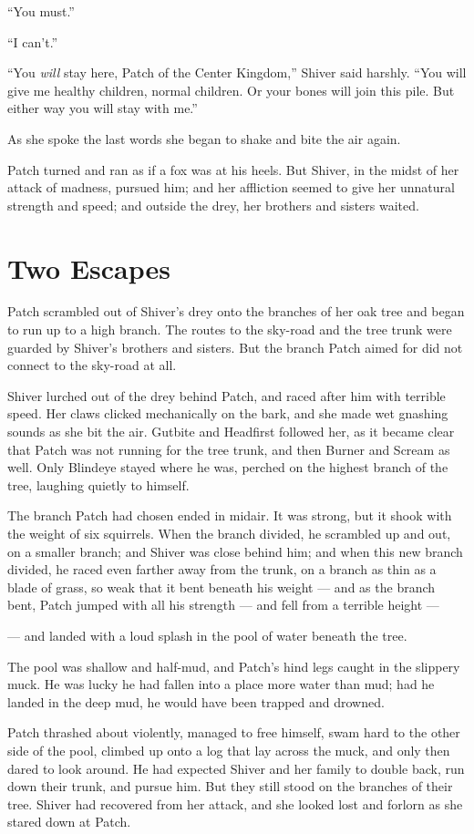\documentclass[ebook,oneside,openany,17pt]{memoir}
\renewcommand{\thechapter}{\Roman{chapter}}
\newcounter{sections}
\newcommand{\sections}[1]{%
  \section*{#1}
  \addtocounter{sections}{1}%
  \pdfbookmark[1]{#1}{section.\thechapter.\thesections}}
\begin{document}
“You must.”

“I can’t.”

“You \emph{will} stay here, Patch of the Center Kingdom,” Shiver
said harshly. “You will give me healthy children, normal children. Or
your bones will join this pile. But either way you will stay with me.”

As she spoke the last words she began to shake and bite the air again.

Patch turned and ran as if a fox was at his heels. But Shiver, in the
midst of her attack of madness, pursued him; and her affliction seemed
to give her unnatural strength and speed; and outside the drey, her
brothers and sisters waited.


\sections{Two Escapes}

Patch scrambled out of Shiver’s drey onto the branches of her oak tree
and began to run up to a high branch. The routes to the sky-road and
the tree trunk were guarded by Shiver’s brothers and sisters. But the
branch Patch aimed for did not connect to the sky-road at all.

Shiver lurched out of the drey behind Patch, and raced after him with
terrible speed. Her claws clicked mechanically on the bark, and she
made wet gnashing sounds as she bit the air. Gutbite and Headfirst
followed her, as it became clear that Patch was not running for the
tree trunk, and then Burner and Scream as well. Only Blindeye stayed
where he was, perched on the highest branch of the tree, laughing
quietly to himself.

The branch Patch had chosen ended in midair. It was strong, but it
shook with the weight of six squirrels. When the branch divided, he
scrambled up and out, on a smaller branch; and Shiver was close behind
him; and when this new branch divided, he raced even farther away from
the trunk, on a branch as thin as a blade of grass, so weak that it
bent beneath his weight — and as the branch bent, Patch jumped with
all his strength — and fell from a terrible height —

— and landed with a loud splash in the pool of water beneath the tree.

The pool was shallow and half-mud, and Patch’s hind legs caught in the
slippery muck. He was lucky he had fallen into a place more water than
mud; had he landed in the deep mud, he would have been trapped and
drowned.

Patch thrashed about violently, managed to free himself, swam hard to
the other side of the pool, climbed up onto a log that lay across the
muck, and only then dared to look around. He had expected Shiver and
her family to double back, run down their trunk, and pursue him. But
they still stood on the branches of their tree. Shiver had recovered
from her attack, and she looked lost and forlorn as she stared down at
Patch.
\end{document}

